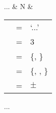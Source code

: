 	\begin{tabu} {}
	...
		& N
		& \begin{tabular}[t]{l l l}
			\ups{\Pred} & = & `...' \\
			\ups{\Pers} & = & 3 \\
			\ups{\Num} & = & \{\Sg{}, \Pl{}\} \\
			\ups{\Gend} & = & \{\M{}, \F{}, \N{}\} \\
			\ups{\Anim} & = & $\pm$ \\
		\end{tabular}
	\end{tabu}

\xe

...

%
%
%
%
